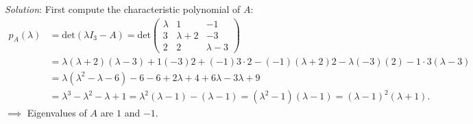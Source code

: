 \documentclass[
  12pt,
  a4paper,
  twoside]{article}
\theoremstyle{plain}
\theoremstyle{definition}
\begin{document}
\emph{Solution}: First compute the characteristic polynomial of \(A\):
\begin{align*}
p_{A}(\lambda ) &= \mathrm{det}( \lambda I_{3} - A) = \mathrm{det} \begin{pmatrix} \lambda & 1 & -1 \\ 3 & \lambda + 2 & -3 \\ 2 & 2 & \lambda - 3 \end{pmatrix}
\\ &= \lambda(\lambda +2)(\lambda -3) + 1(-3)2 + (-1)3 \cdot 2 - (-1)( \lambda + 2)2 - \lambda(-3)(2) - 1 \cdot 3 (\lambda -3)
\\ &= \lambda (\lambda^{2} - \lambda - 6) - 6 - 6 + 2 \lambda + 4 + 6 \lambda - 3 \lambda + 9
\\ &= \lambda^{3} - \lambda^{2} - \lambda + 1 = \lambda^{2} (\lambda - 1) - (\lambda - 1) = (\lambda^{2} - 1)(\lambda - 1) = (\lambda - 1)^{2} (\lambda + 1).
\end{align*}
\(\implies\) Eigenvalues of \(A\) are \(1\) and \(-1\).
\end{document}
